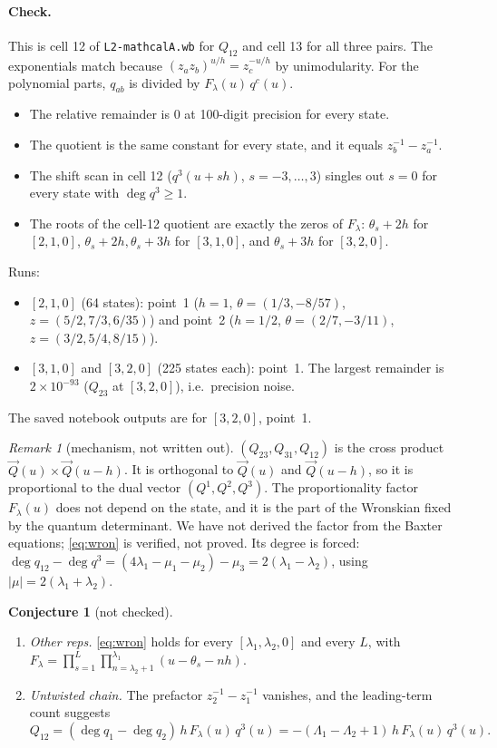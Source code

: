 \documentclass[11pt]{article}
\newcommand{\nb}[1]{\texttt{#1}}
\theoremstyle{definition}
\newtheorem{conjecture}{Conjecture}
\theoremstyle{remark}
\newtheorem*{remark}{Remark}
\begin{document}
\paragraph{Check.} This is cell 12 of \nb{L2-mathcalA.wb} for $Q_{12}$ and cell 13 for all three pairs. The exponentials match because $(z_az_b)^{u/h}=z_c^{-u/h}$ by unimodularity. For the polynomial parts, $q_{ab}$ is divided by $F_\lambda(u)\,q^c(u)$.
\begin{itemize}
\item The relative remainder is $0$ at 100-digit precision for every state.
\item The quotient is the same constant for every state, and it equals $z_b^{-1}-z_a^{-1}$.
\item The shift scan in cell 12 ($q^3(u+sh)$, $s=-3,\dots,3$) singles out $s=0$ for every state with $\deg q^3\geq1$.
\item The roots of the cell-12 quotient are exactly the zeros of $F_\lambda$: $\theta_s+2h$ for $[2,1,0]$, $\theta_s+2h,\theta_s+3h$ for $[3,1,0]$, and $\theta_s+3h$ for $[3,2,0]$.
\end{itemize}
Runs:
\begin{itemize}
\item $[2,1,0]$ (64 states): point~1 ($h=1$, $\theta=(1/3,-8/57)$, $z=(5/2,7/3,6/35)$) and point~2 ($h=1/2$, $\theta=(2/7,-3/11)$, $z=(3/2,5/4,8/15)$).
\item $[3,1,0]$ and $[3,2,0]$ (225 states each): point~1. The largest remainder is $2\times10^{-93}$ ($Q_{23}$ at $[3,2,0]$), i.e.\ precision noise.
\end{itemize}
The saved notebook outputs are for $[3,2,0]$, point~1.

\begin{remark}[mechanism, not written out]
$(Q_{23},Q_{31},Q_{12})$ is the cross product $\vec Q(u)\times\vec Q(u-h)$. It is orthogonal to $\vec Q(u)$ and $\vec Q(u-h)$, so it is proportional to the dual vector $(Q^1,Q^2,Q^3)$. The proportionality factor $F_\lambda(u)$ does not depend on the state, and it is the part of the Wronskian fixed by the quantum determinant. We have not derived the factor from the Baxter equations; \eqref{eq:wron} is verified, not proved. Its degree is forced: $\deg q_{12}-\deg q^3=(4\lambda_1-\mu_1-\mu_2)-\mu_3=2(\lambda_1-\lambda_2)$, using $|\mu|=2(\lambda_1+\lambda_2)$.
\end{remark}

\begin{conjecture}[not checked]
\begin{enumerate}
\item \emph{Other reps.} \eqref{eq:wron} holds for every $[\lambda_1,\lambda_2,0]$ and every $L$, with $F_\lambda=\prod_{s=1}^L\prod_{n=\lambda_2+1}^{\lambda_1}(u-\theta_s-nh)$.
\item \emph{Untwisted chain.} The prefactor $z_2^{-1}-z_1^{-1}$ vanishes, and the leading-term count suggests
\begin{equation}
Q_{12}=(\deg q_1-\deg q_2)\,h\,F_\lambda(u)\,q^3(u)=-(\Lambda_1-\Lambda_2+1)\,h\,F_\lambda(u)\,q^3(u).
\end{equation}
\end{enumerate}
\end{conjecture}
\end{document}
